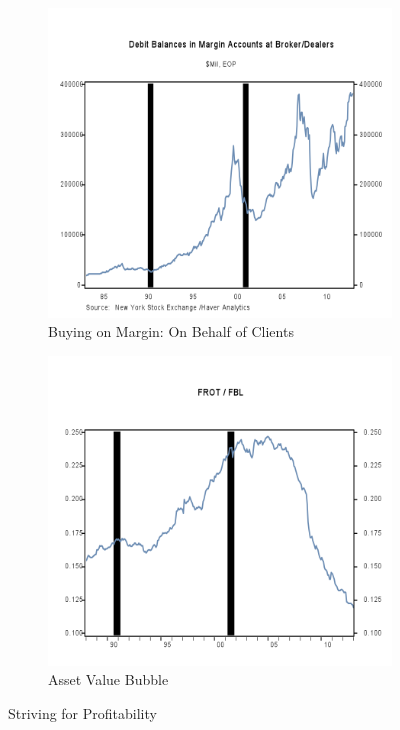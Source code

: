 \begin{figure}[H]
\centering
\begin{subfigure}{.5\textwidth}
  \centering
  \includegraphics[width=0.9\linewidth]{figure/DebitBalancesMargin.png}
  \caption{Buying on Margin: On Behalf of Clients}
  \label{fig:debitMargin}
\end{subfigure}%
\begin{subfigure}{.5\textwidth}
  \centering
  \includegraphics[width=1.0\linewidth]{figure/Bubble.png}
  \caption{Asset Value Bubble}
  \label{fig:bubble}
\end{subfigure}
\caption{Striving for Profitability}
\label{fig:NEW2}
\end{figure}







